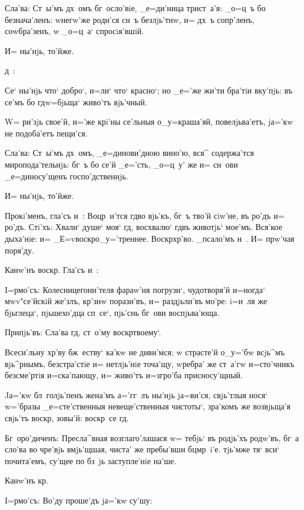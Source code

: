Сла'ва: Ст~ы'мъ дх~омъ бг~осло'вiе, _е=ди'ница 
трист~а'я: _о=ц~ъ бо безнача'ленъ: w\т негw'же роди'ся 
сн~ъ безлjь'тнw, и= дх~ъ сопр'ленъ, соwбра'зенъ, w\т 
_о=ц~а` спросiя'вшiй.

И= ны'нjь, то'йже.

 д~:

Се` ны'нjь что` добро`, и=ли` что` красно`; но _е='же 
жи'ти бра'тiи вку'пjь: въ се'мъ бо гд w=бjьща` живо'тъ 
вjь'чный.

W= ри'зjь свое'й, и='же крi'ны се'льныя о_у=краша'яй, 
повелjьва'етъ, jа='кw не подоба'етъ пещи'ся.

Сла'ва: Ст~ы'мъ дх~омъ, _е=динови'дною вино'ю, вся^ 
содержа'тся миропода'тельнjь: бг~ъ бо се'й _е='сть, 
_о=ц~у' же и= сн~ови _е=диносу'щенъ госпо'дственнjь.

И= ны'нjь, то'йже.

Прокi'менъ, гла'съ и~: Воцр~и'тся гд во вjь'къ, 
бг~ъ тво'й сiw'не, въ ро'дъ и= ро'дъ. Стi'хъ: Хвали` 
душе` моя` гд, восхвалю` гд въ животjь` мое'мъ. 
Вся'кое дыха'нiе: и= _Е=v воскр о_у='треннее. 
Воскр хр'во. _псало'мъ н~. И= прw'чая поря'ду.

Канw'нъ воскр. Гла'съ и~:


I=рмо'съ: Колесницегони'теля фараw'ня погрузи`, 
чудотворя'й и=ногда` мwv"се'йскiй же'злъ, кр'знw 
порази'въ, и= раздjьли'въ мо'ре: i=и~ля же бjьглеца`, 
пjьшехо'дца сп~се`, пjь'снь бг~ови воспjьва'юща.

Припjь'въ: Сла'ва гд, ст~о'му воскр твоему`.

Всеси'льну хр'ву бж~еству` ка'кw не диви'мся; w\т 
страсте'й о_у='бw всjь^мъ вjь^рнымъ, безстра'стiе и= 
нетлjь'нiе точа'щу, w\т ребра' же ст~а'гw и=сто'чникъ 
безсме'ртiя и=ска'пающу, и= живо'тъ и=з\ъ гро'ба 
присносу'щный.

Jа='кw бл~голjь'пенъ жена'мъ а='гг~лъ ны'нjь jа=ви'ся, 
свjь'тлыя нося` w='бразы _е=сте'ственныя невеще'ственныя 
чистоты`, зра'комъ же возвjьща'я свjь'тъ воскр, 
зовы'й: воскр~се гд.

Бг~оро'диченъ: Пресла^вная возглаго'лашася w= тебjь` 
въ родjь'хъ родw'въ, бг~а сло'ва во чре'вjь вмjь'щшая, 
чиста' же пребы'вши бц мр~i'е. тjь'мже тя` вси` 
почита'емъ, су'щее по бз~jь заступле'нiе на'ше.

Канw'нъ кр.

I=рмо'съ: Во'ду проше'дъ jа='кw су'шу:

